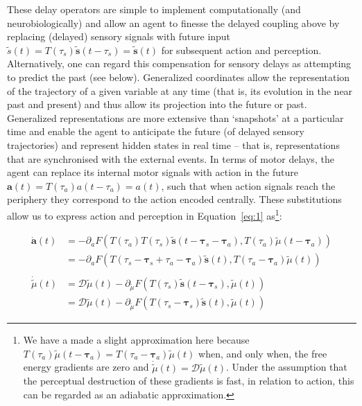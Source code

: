 \documentclass[a4paper]{article} %
\begin{document}
These delay operators are simple to implement computationally (and
neurobiologically) and allow an agent to finesse the delayed coupling
above by replacing (delayed) sensory signals with future input
$\tilde{s}(t)=T(\tau_s)\bm{\tilde{s}}(t-\tau_s) = \bm{\tilde{s}}(t)$ for subsequent action and perception. Alternatively, one
can regard this compensation for sensory delays as attempting to predict
the past (see below). Generalized coordinates allow the representation
of the trajectory of a given variable at any time (that is, its
evolution in the near past and present) and thus allow its projection
into the future or past. Generalized representations are more extensive
than `snapshots' at a particular time and enable the agent to anticipate
the future (of delayed sensory trajectories) and represent hidden states
in real time -- that is, representations that are synchronised with the
external events. In terms of motor delays, the agent can replace its
internal motor signals with action in the future
$\bm{a}(t) = T(\tau_a) a(t-\tau_a) = a(t) $,
such that when action signals reach the periphery they correspond to the
action encoded centrally. These substitutions allow us to express action
and perception in Equation~\ref{eq:1}
as\footnote{We have a made a slight approximation here because $T(\tau_a) \tilde{\mu}(t-\bm{\tau}_a) = T(\tau_a-\bm{\tau}_a) \tilde{\mu}(t)$ when, and only when, the free energy gradients are zero and $\dot{\tilde{\mu}}(t) = \mathcal{D} \tilde{\mu}(t)$. Under the assumption that the perceptual destruction of these gradients is fast, in relation to action, this can
be regarded as an adiabatic approximation.}:

\begin{align}
\bm{\dot{a}}(t) &= -\partial_a F(T(\tau_a) T(\tau_s)  \bm{\tilde{s}}(t-\bm{\tau}_s-\bm{\tau}_a), T(\tau_a) \tilde{\mu}(t-\bm{\tau}_a))\nonumber  \\%
                &= -\partial_a F(T(\tau_s-\bm{\tau}_s+\tau_a-\bm{\tau}_a)  \bm{\tilde{s}}(t), T(\tau_a-\bm{\tau}_a) \tilde{\mu}(t))\nonumber  \\%
\label{eq:6} \\%
\dot{\tilde{\mu}}(t) &= \mathcal{D}\tilde{\mu}(t)-\partial_{\tilde{\mu}} F(T(\tau_s) \bm{\tilde{s}}(t-\bm{\tau}_s), \tilde{\mu}(t))\nonumber  \\%
                &= \mathcal{D}\tilde{\mu}(t)-\partial_{\tilde{\mu}} F(T(\tau_s-\bm{\tau}_s) \bm{\tilde{s}}(t), \tilde{\mu}(t))\nonumber  %
\end{align}%
\end{document}
